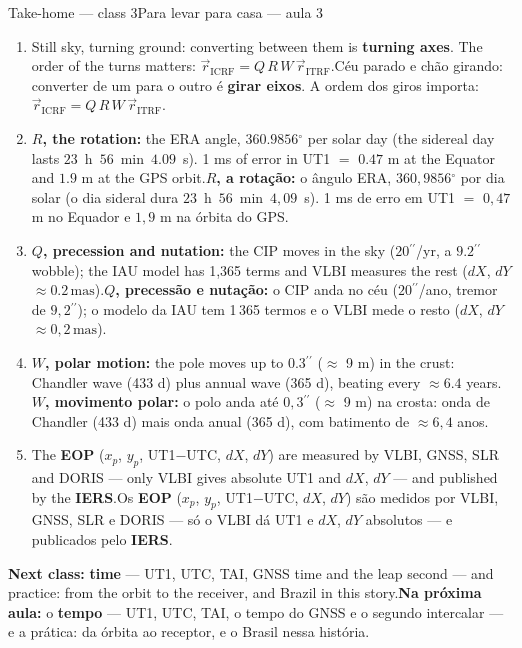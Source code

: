 \documentclass[aspectratio=169,11pt]{beamer}
\newcommand{\tr}[2]{\ifEN#2\else#1\fi}
\newcommand{\bnum}[1]{\textbf{\textcolor{mTeal}{#1}}}
\newcommand{\asec}{\ensuremath{{}^{\prime\prime}}}
\newcommand{\gr}{\ensuremath{{}^{\circ}}}
\newcommand{\mas}{\ensuremath{\,\mathrm{mas}}\xspace}
\begin{document}
\begin{frame}{\tr{Para levar para casa --- aula 3}{Take-home --- class 3}}
  \footnotesize
  \begin{enumerate}
    \setlength{\itemsep}{2pt}
    \item \tr{Céu parado e chão girando: converter de um para o outro é \bnum{girar eixos}. A ordem dos giros importa: $\vec r_{\text{ICRF}} = Q\,R\,W\,\vec r_{\text{ITRF}}$.}{Still sky, turning ground: converting between them is \bnum{turning axes}. The order of the turns matters: $\vec r_{\text{ICRF}} = Q\,R\,W\,\vec r_{\text{ITRF}}$.}
    \item \tr{\bnum{$R$, a rotação:} o ângulo ERA, $360{,}9856\gr$ por dia solar (o dia sideral dura \mbox{$23$ h $56$ min $4{,}09$ s}). 1 ms de erro em UT1 $=$ $0{,}47$ m no Equador e $1{,}9$ m na órbita do GPS.}{\bnum{$R$, the rotation:} the ERA angle, $360.9856\gr$ per solar day (the sidereal day lasts \mbox{$23$ h $56$ min $4.09$ s}). 1 ms of error in UT1 $=$ $0.47$ m at the Equator and $1.9$ m at the GPS orbit.}
    \item \tr{\bnum{$Q$, precessão e nutação:} o CIP anda no céu ($20\asec$/ano, tremor de $9{,}2\asec$); o modelo da IAU tem 1\,365 termos e o VLBI mede o resto ($dX$, $dY$ $\approx 0{,}2\mas$).}{\bnum{$Q$, precession and nutation:} the CIP moves in the sky ($20\asec$/yr, a $9.2\asec$ wobble); the IAU model has 1,365 terms and VLBI measures the rest ($dX$, $dY$ $\approx 0.2\mas$).}
    \item \tr{\bnum{$W$, movimento polar:} o polo anda até $0{,}3\asec$ ($\approx$ 9 m) na crosta: onda de Chandler (433 d) mais onda anual (365 d), com batimento de $\approx 6{,}4$ anos.}{\bnum{$W$, polar motion:} the pole moves up to $0.3\asec$ ($\approx$ 9 m) in the crust: Chandler wave (433 d) plus annual wave (365 d), beating every $\approx 6.4$ years.}
    \item \tr{Os \bnum{EOP} ($x_p$, $y_p$, UT1$-$UTC, $dX$, $dY$) são medidos por VLBI, GNSS, SLR e DORIS --- só o VLBI dá UT1 e $dX$, $dY$ absolutos --- e publicados pelo \bnum{IERS}.}{The \bnum{EOP} ($x_p$, $y_p$, UT1$-$UTC, $dX$, $dY$) are measured by VLBI, GNSS, SLR and DORIS --- only VLBI gives absolute UT1 and $dX$, $dY$ --- and published by the \bnum{IERS}.}
  \end{enumerate}
  \begin{ideia}
    \scriptsize \tr{\textbf{Na próxima aula:} o \bnum{tempo} --- UT1, UTC, TAI, o tempo do GNSS e o segundo intercalar --- e a prática: da órbita ao receptor, e o Brasil nessa história.}{\textbf{Next class:} \bnum{time} --- UT1, UTC, TAI, GNSS time and the leap second --- and practice: from the orbit to the receiver, and Brazil in this story.}
  \end{ideia}
\end{frame}
\end{document}
